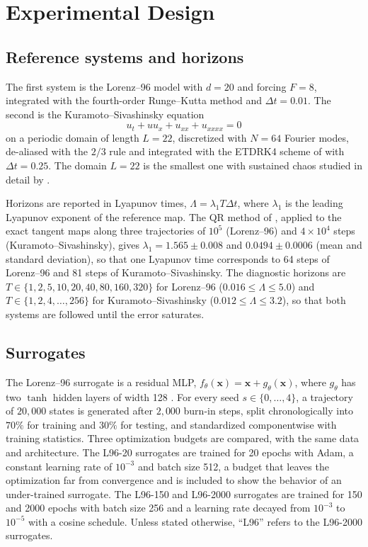 \section{Experimental Design}
\label{sec:design}

\subsection{Reference systems and horizons}

The first system is the Lorenz--96 model \citep{lorenz1996} with $d=20$ and forcing $F=8$, integrated with the fourth-order Runge--Kutta method and $\Delta t=0.01$. The second is the Kuramoto--Sivashinsky equation
\begin{equation}
  u_t+uu_x+u_{xx}+u_{xxxx}=0
  \label{eq:ks}
\end{equation}
on a periodic domain of length $L=22$, discretized with $N=64$ Fourier modes, de-aliased with the $2/3$ rule and integrated with the ETDRK4 scheme of \citet{kassam2005} with $\Delta t=0.25$. The domain $L=22$ is the smallest one with sustained chaos studied in detail by \citet{cvitanovic2010}.

Horizons are reported in Lyapunov times, $\Lambda=\lambda_1T\Delta t$, where $\lambda_1$ is the leading Lyapunov exponent of the reference map. The QR method of \citet{benettin1980}, applied to the exact tangent maps along three trajectories of $10^5$ (Lorenz--96) and $4\times10^4$ steps (Kuramoto--Sivashinsky), gives $\lambda_1=1.565\pm0.008$ and $0.0494\pm0.0006$ (mean and standard deviation), so that one Lyapunov time corresponds to 64 steps of Lorenz--96 and 81 steps of Kuramoto--Sivashinsky. The diagnostic horizons are $T\in\{1,2,5,10,20,40,80,160,320\}$ for Lorenz--96 ($0.016\le\Lambda\le5.0$) and $T\in\{1,2,4,\ldots,256\}$ for Kuramoto--Sivashinsky ($0.012\le\Lambda\le3.2$), so that both systems are followed until the error saturates.

\subsection{Surrogates}

The Lorenz--96 surrogate is a residual MLP, $f_\theta(\mathbf x)=\mathbf x+g_\theta(\mathbf x)$, where $g_\theta$ has two $\tanh$ hidden layers of width 128 \citep{he2016}. For every seed $s\in\{0,\ldots,4\}$, a trajectory of $20{,}000$ states is generated after $2{,}000$ burn-in steps, split chronologically into $70\%$ for training and $30\%$ for testing, and standardized componentwise with training statistics. Three optimization budgets are compared, with the same data and architecture. The L96-20 surrogates are trained for 20 epochs with Adam, a constant learning rate of $10^{-3}$ and batch size 512, a budget that leaves the optimization far from convergence and is included to show the behavior of an under-trained surrogate. The L96-150 and L96-2000 surrogates are trained for 150 and 2000 epochs with batch size 256 and a learning rate decayed from $10^{-3}$ to $10^{-5}$ with a cosine schedule. Unless stated otherwise, ``L96'' refers to the L96-2000 surrogates.

